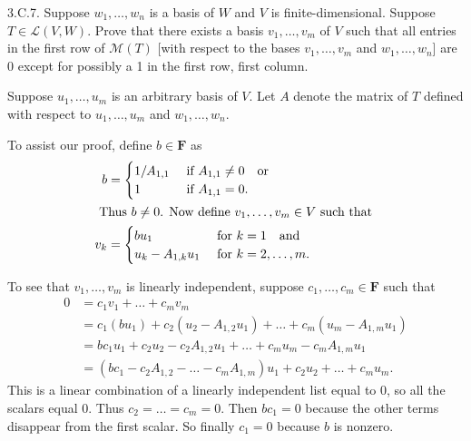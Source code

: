 \documentclass[a5paper]{article}
\begin{document}
\newcommand   \C           {\mathbf{C}}
\newcommand   \R           {\mathbf{R}}
\renewcommand \L           {\mathcal{L}}
\newcommand   \F           {\mathbf{F}}
\renewcommand \P           {\mathcal{P}}
\newcommand   \M           {\mathcal{M}}
\newcommand   \op          {\operatorname}

    3.C.7.
    Suppose $w_1,\dots,w_n$ is a basis of $W$ and $V$ is finite-dimensional.
    Suppose $T \in \L(V,W)$.
    Prove that there exists a basis $v_1,\dots,v_m$ of $V$ such that all entries in the first row of $\M(T)$ [with respect to the bases $v_1,\dots,v_m$ and $w_1,\dots,w_n$] are 0 except for possibly a 1 in the first row, first column.

    Suppose $u_1,\dots,u_m$ is an arbitrary basis of $V$.
    Let $A$ denote the matrix of $T$ defined with respect to $u_1,\dots,u_m$ and $w_1,\dots,w_n$.

    To assist our proof, define $b \in \F$ as
\begin{align*}
        b &=
        \begin{cases}
            1/A_{1,1} \    &\text{if}\ A_{1,1} \neq 0 \quad\text{or} \\
            1         \    &\text{if}\ A_{1,1} = 0 .
        \end{cases} \\
\intertext{
    Thus $b \neq 0$.
    Now define $v_1,\dots,v_m \in V$ such that
}
        v_k &=
        \begin{cases}
            b u_1            \    &\text{for}\ k = 1 \quad\text{and} \\
            u_k - A_{1,k}u_1 \    &\text{for}\ k = 2,\dots,m .
        \end{cases}
\end{align*}

    To see that $v_1,\dots,v_m$ is linearly independent, suppose $c_1,\dots,c_m \in \F$ such that
\begin{align*}
        0 &= c_1v_1 + \dots + c_mv_m   \\
          &= c_1(b u_1) + c_2(u_2 - A_{1,2}u_1) + \dots + c_m(u_m - A_{1,m}u_1) \\
          &= b c_1u_1 + c_2u_2 - c_2A_{1,2}u_1 + \dots + c_mu_m - c_mA_{1,m}u_1 \\
          &= (b c_1 - c_2A_{1,2} - \dots - c_mA_{1,m})u_1 + c_2u_2 + \dots + c_mu_m .
\end{align*}
    This is a linear combination of a linearly independent list equal to 0, so all the scalars equal 0.
    Thus $c_2=\dots=c_m=0$.
    Then $bc_1=0$ because the other terms disappear from the first scalar.
    So finally $c_1=0$ because $b$ is nonzero.
\end{document}
